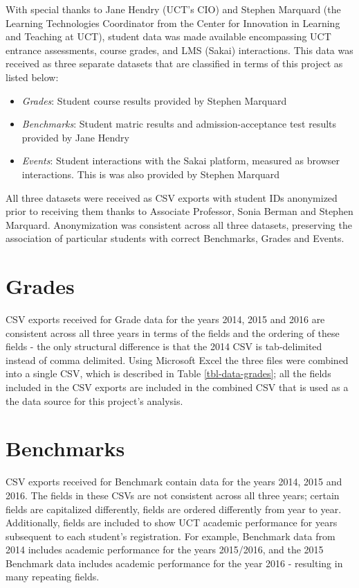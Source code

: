 With special thanks to Jane Hendry (UCT's CIO) and Stephen Marquard (the Learning Technologies Coordinator from the Center for Innovation in Learning and Teaching at UCT), student data was made available encompassing UCT entrance assessments, course grades, and LMS (Sakai) interactions. This data was received as three separate datasets that are classified in terms of this project as listed below:

\begin{itemize}
    \item \textit{Grades}: Student course results provided by Stephen Marquard
    \item \textit{Benchmarks}: Student matric results and admission-acceptance test results provided by Jane Hendry
    \item \textit{Events}: Student interactions with the Sakai platform, measured as browser interactions. This is was also provided by Stephen Marquard
\end{itemize}

All three datasets were received as CSV exports with student IDs anonymized prior to receiving them thanks to Associate Professor, Sonia Berman and Stephen Marquard. Anonymization was consistent across all three datasets, preserving the association of particular students with correct Benchmarks, Grades and Events.

\section{Grades}
CSV exports received for Grade data for the years 2014, 2015 and 2016 are consistent across all three years in terms of the fields and the ordering of these fields - the only structural difference is that the 2014 CSV is tab-delimited instead of comma delimited. Using Microsoft Excel the three files were combined into a single CSV, which is described in Table \ref{tbl-data-grades}; all the fields included in the CSV exports are included in the combined CSV that is used as a the data source for this project's analysis.

\section{Benchmarks}
CSV exports received for Benchmark contain data for the years 2014, 2015 and 2016. The fields in these CSVs are not consistent across all three years; certain fields are capitalized differently, fields are ordered differently from year to year. Additionally, fields are included to show UCT academic performance for years subsequent to each student's registration. For example, Benchmark data from 2014 includes academic performance for the years 2015/2016, and the 2015 Benchmark data includes academic performance for the year 2016 - resulting in many repeating fields.


